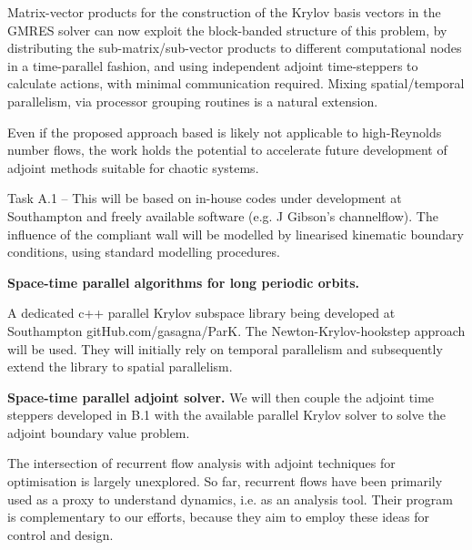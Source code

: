 Matrix-vector products for the construction of the Krylov basis
vectors in the GMRES solver can now exploit the block-banded
structure of this problem, by distributing the
sub-matrix/sub-vector products to different computational nodes in
a time-parallel fashion, and using independent adjoint
time-steppers to calculate actions, with minimal communication
required. Mixing spatial/temporal parallelism, via processor
grouping routines is a natural
extension.

Even if the proposed approach based is likely not applicable to
high-Reynolds number flows, the work holds the potential to accelerate
future development of adjoint methods suitable for chaotic systems. %


Task A.1 – This will be based on in-house codes under development at Southampton and
freely available software (e.g. J Gibson's channelflow). The influence of
the compliant wall will be modelled by linearised kinematic boundary
conditions, using standard modelling procedures. %


{\bf Space-time parallel algorithms for long periodic orbits.}

A dedicated c++ parallel Krylov
subspace library being developed at Southampton
 {gitHub.com/gasagna/ParK}. The
Newton-Krylov-hookstep %
approach will be used. They will
initially rely on temporal parallelism and subsequently extend the
library to spatial parallelism.

{\bf Space-time parallel adjoint solver.}
We will then couple
the adjoint time steppers developed in B.1 with the available
parallel Krylov solver to solve the adjoint boundary value problem.


The intersection of recurrent flow analysis with adjoint
techniques for optimisation is largely unexplored. So far,
recurrent flows have been primarily used as a proxy to understand
dynamics, i.e. as an analysis tool. Their program is
complementary to our efforts, because they aim to employ these
ideas for control and design.

\bigskip


